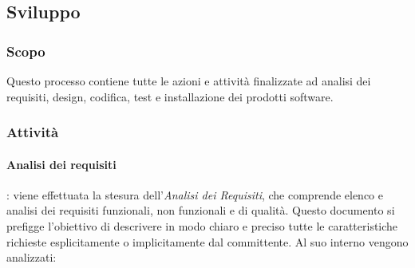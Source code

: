 \subsection{Sviluppo}
\subsubsection{Scopo} Questo processo contiene tutte le azioni e attività finalizzate ad analisi dei requisiti, design, codifica, test e installazione dei prodotti software\glo \:.
\subsubsection{Attività}

\paragraph{Analisi dei requisiti}: viene effettuata la stesura dell'\textit{Analisi dei Requisiti}, che comprende elenco e analisi dei requisiti funzionali, non funzionali e di qualità. Questo documento si prefigge l'obiettivo di descrivere in modo chiaro e preciso tutte le caratteristiche richieste esplicitamente o implicitamente dal committente.
    Al suo interno vengono analizzati:
